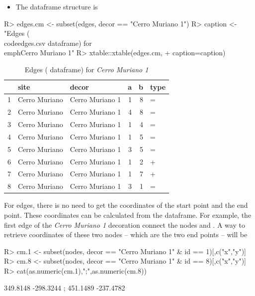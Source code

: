 \documentclass[article]{jss}
\begin{document}
\begin{itemize}
\item The  dataframe structure is
\end{itemize}

\begin{Schunk}
\begin{Sinput}
R> edges.cm <- subset(edges, decor == "Cerro Muriano 1")
R> caption <- "Edges (\\code{edges.csv} dataframe) for \\emph{Cerro Muriano 1}"
R> xtable::xtable(edges.cm,
+                 caption=caption)
\end{Sinput}
\begin{table}[ht]
\centering
\begin{tabular}{rllrrl}
  \hline
 & site & decor & a & b & type \\ 
  \hline
1 & Cerro Muriano & Cerro Muriano 1 &   1 &   8 & = \\ 
  2 & Cerro Muriano & Cerro Muriano 1 &   4 &   8 & = \\ 
  3 & Cerro Muriano & Cerro Muriano 1 &   1 &   4 & = \\ 
  4 & Cerro Muriano & Cerro Muriano 1 &   1 &   5 & = \\ 
  5 & Cerro Muriano & Cerro Muriano 1 &   3 &   5 & = \\ 
  6 & Cerro Muriano & Cerro Muriano 1 &   1 &   2 & + \\ 
  7 & Cerro Muriano & Cerro Muriano 1 &   1 &   7 & + \\ 
  8 & Cerro Muriano & Cerro Muriano 1 &   3 &   1 & = \\ 
   \hline
\end{tabular}
\caption{Edges ( dataframe) for \emph{Cerro Muriano 1}} 
\end{table}\end{Schunk}

For edges, there is no need to get the coordinates of the start point and the end point. These coordinates can be calculated from the  dataframe. For example, the first edge of the \emph{Cerro Muriano 1} decoration connect the nodes  and . A way to retrieve coordinates of these two nodes -- which are the two end points -- will be

\begin{Schunk}
\begin{Sinput}
R> cm.1 <- subset(nodes, decor == "Cerro Muriano 1" & id == 1)[,c("x","y")]
R> cm.8 <- subset(nodes, decor == "Cerro Muriano 1" & id == 8)[,c("x","y")]
R> cat(as.numeric(cm.1),";",as.numeric(cm.8))
\end{Sinput}
\begin{Soutput}
349.8148 -298.3244 ; 451.1489 -237.4782
\end{Soutput}
\end{Schunk}
\end{document}
